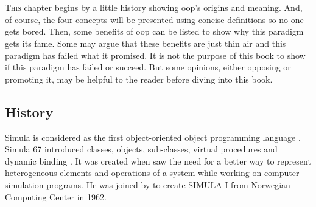 \documentclass[12pt]{book}
\begin{document}
\fi

\chapter{}

\begin{introduction} %
	\lettrine{T}{his} chapter begins by a little history showing \ac{oop}'s origins and meaning.
	And, of course, the four concepts will be presented using concise definitions so no one gets bored.
	Then, some benefits of \ac{oop} can be listed to show why this paradigm gets its fame.
	Some may argue that these benefits are just thin air and this paradigm has failed what it promised.  
	It is not the purpose of this book to show if this paradigm has failed or succeed. 
	But some opinions, either opposing or promoting it, may be helpful to the reader before diving into this book.
\end{introduction}

\section{History}

Simula is considered as the first object-oriented object programming language \citep{2004-huang}.
Simula 67 introduced classes, objects, sub-classes, virtual procedures and dynamic binding \citep{2013-black}.
It was created when  saw the need for a better way to represent heterogeneous elements and operations of a system while working on computer simulation programs.
He was joined by  to create SIMULA I from Norwegian Computing Center in 1962.
\end{document}
